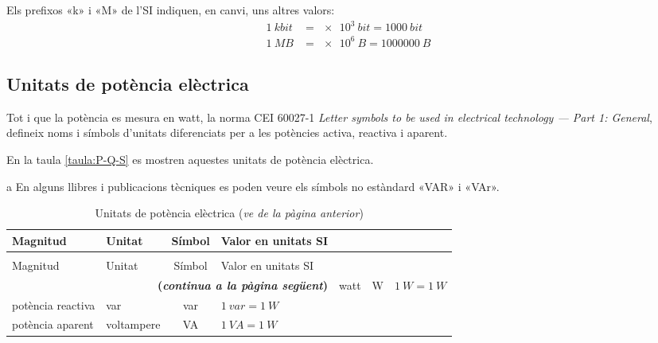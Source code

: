 Els prefixos «k» i «M» de l'SI indiquen, en canvi, uns altres valors:
\begin{align*}
	\qty{1}{kbit} &= \qty[print-unity-mantissa = false]{e3}{bit} = \qty{1000}{bit} \\
	\qty{1}{MB} &=\qty[print-unity-mantissa = false]{e6}{B} = \qty{1000000}{B}
\end{align*}


\subsection{Unitats de potència elèctrica}

Tot i que la potència es mesura en watt, la norma CEI 60027-1 \textit{Letter symbols to be used in electrical technology --- Part 1: General}, defineix noms i símbols d'unitats diferenciats per a les potències activa, reactiva i aparent.

En la taula \vref{taula:P-Q-S} es mostren aquestes unitats de potència elèctrica.

\begin{ThreePartTable}
	\begin{TableNotes}
		\item[a] {\footnotesize En alguns llibres i publicacions tècniques es poden veure els símbols no estàndard «VAR» i «VAr».}
	\end{TableNotes}
\begin{longtable}[h]{llcl}
   \caption{\label{taula:P-Q-S} Unitats de potència elèctrica}\\
   \toprule[1pt]
    Magnitud & Unitat &  Símbol & Valor en unitats SI \\
   \midrule
   \endfirsthead
   \caption[]{Unitats de potència elèctrica (\emph{ve de la pàgina anterior})}\\
   \toprule[1pt]
    Magnitud & Unitat &  Símbol & Valor en unitats SI \\
   \midrule
   \endhead
   \midrule
   \multicolumn{4}{r}{\sffamily\bfseries\color{NavyBlue}(\emph{continua a la pàgina següent})}
   \endfoot
   \insertTableNotes
   \endlastfoot
   potència activa & watt &  \unit{W}& $\qty{1}{W} = \qty{1}{W}$  \\
   potència reactiva & var &  \unit{var}\tnote{a} & $\qty{1}{var} = \qty{1}{W}$  \\
   potència aparent & voltampere &  \unit{VA}& $\qty{1}{VA} = \qty{1}{W}$  \\
   \bottomrule[1pt]
\end{longtable}
\end{ThreePartTable}




